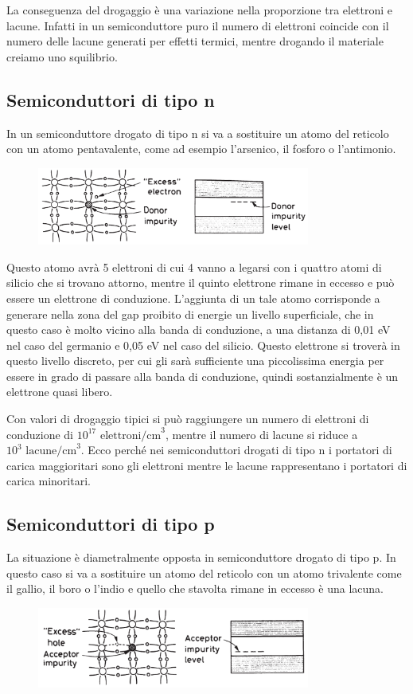 La conseguenza del drogaggio è una variazione nella proporzione tra elettroni e lacune. Infatti in un semiconduttore puro il numero di elettroni coincide con il numero delle lacune generati per effetti termici, mentre drogando il materiale creiamo uno squilibrio.

\subsection{Semiconduttori di tipo n}
In un semiconduttore drogato di tipo n si va a sostituire un atomo del reticolo con un atomo pentavalente, come ad esempio l'arsenico, il fosforo o l'antimonio.
\begin{figure}[H]
   \centering
   \includegraphics[width=0.8\textwidth]{immagini/semiconduttori_drogati_tipo_n.png}
\end{figure}
Questo atomo avrà 5 elettroni di cui 4 vanno a legarsi con i quattro atomi di silicio che si trovano attorno, mentre il quinto elettrone rimane in eccesso e può essere un elettrone di conduzione. L'aggiunta di un tale atomo corrisponde a generare nella zona del gap proibito di energie un livello superficiale, che in questo caso è molto vicino alla banda di conduzione, a una distanza di 0,01 eV nel caso del germanio e 0,05 eV nel caso del silicio. Questo elettrone si troverà in questo livello discreto, per cui gli sarà sufficiente una piccolissima energia per essere in grado di passare alla banda di conduzione, quindi sostanzialmente è un elettrone quasi libero.

Con valori di drogaggio tipici si può raggiungere un numero di elettroni di conduzione di $10^{17}\text{ elettroni/cm}^3$, mentre il numero di lacune si riduce a $10^3\text{ lacune/cm}^3$. Ecco perché nei semiconduttori drogati di tipo n i portatori di carica maggioritari sono gli elettroni mentre le lacune rappresentano i portatori di carica minoritari.
\subsection{Semiconduttori di tipo p}
La situazione è diametralmente opposta in semiconduttore drogato di tipo p. In questo caso si va a sostituire un atomo del reticolo con un atomo trivalente come il gallio, il boro o l'indio e quello che stavolta rimane in eccesso è una lacuna.
\begin{figure}[H]
   \centering
   \includegraphics[width=0.8\textwidth]{immagini/semiconduttori_drogati_tipo_p.png}
\end{figure}

